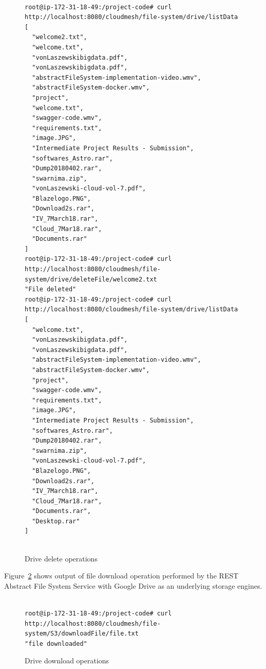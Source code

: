 \begin{figure}[!ht]
\begin{footnotesize}
\begin{verbatim}

root@ip-172-31-18-49:/project-code# curl http://localhost:8080/cloudmesh/file-system/drive/listData
[
  "welcome2.txt",
  "welcome.txt",
  "vonLaszewskibigdata.pdf",
  "vonLaszewskibigdata.pdf",
  "abstractFileSystem-implementation-video.wmv",
  "abstractFileSystem-docker.wmv",
  "project",
  "welcome.txt",
  "swagger-code.wmv",
  "requirements.txt",
  "image.JPG",
  "Intermediate Project Results - Submission",
  "softwares_Astro.rar",
  "Dump20180402.rar",
  "swarnima.zip",
  "vonLaszewski-cloud-vol-7.pdf",
  "Blazelogo.PNG",
  "Download2s.rar",
  "IV_7March18.rar",
  "Cloud_7Mar18.rar",
  "Documents.rar"
]
root@ip-172-31-18-49:/project-code# curl http://localhost:8080/cloudmesh/file-system/drive/deleteFile/welcome2.txt
"File deleted"
root@ip-172-31-18-49:/project-code# curl http://localhost:8080/cloudmesh/file-system/drive/listData
[
  "welcome.txt",
  "vonLaszewskibigdata.pdf",
  "vonLaszewskibigdata.pdf",
  "abstractFileSystem-implementation-video.wmv",
  "abstractFileSystem-docker.wmv",
  "project",
  "swagger-code.wmv",
  "requirements.txt",
  "image.JPG",
  "Intermediate Project Results - Submission",
  "softwares_Astro.rar",
  "Dump20180402.rar",
  "swarnima.zip",
  "vonLaszewski-cloud-vol-7.pdf",
  "Blazelogo.PNG",
  "Download2s.rar",
  "IV_7March18.rar",
  "Cloud_7Mar18.rar",
  "Documents.rar",
  "Desktop.rar"
]


\end{verbatim}
\end{footnotesize}
\caption{Drive delete operations}\label{fig:drive-delete}
\end{figure}


Figure~\ref{fig:drive-download} shows output of file download
operation performed by the REST Abstract File System Service with
Google Drive as an underlying storage engines.

\begin{figure}[!ht]
\begin{footnotesize}
\begin{verbatim}

root@ip-172-31-18-49:/project-code# curl http://localhost:8080/cloudmesh/file-system/S3/downloadFile/file.txt
"file downloaded"

\end{verbatim}
\end{footnotesize}
\caption{Drive download operations}\label{fig:drive-download}
\end{figure}


